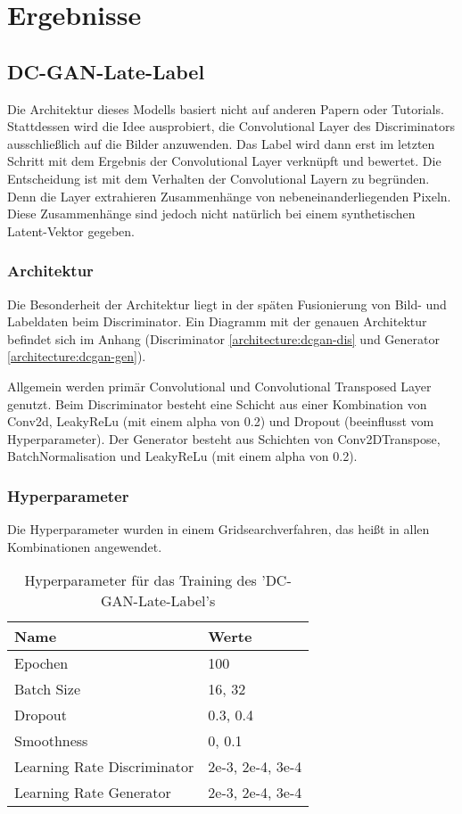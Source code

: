 
\chapter{Ergebnisse}

\section{DC-GAN-Late-Label}
Die Architektur dieses Modells basiert nicht auf anderen Papern oder Tutorials. 
Stattdessen wird die Idee ausprobiert, die Convolutional Layer des Discriminators ausschließlich auf die Bilder anzuwenden.
Das Label wird dann erst im letzten Schritt mit dem Ergebnis der Convolutional Layer verknüpft und bewertet.
Die Entscheidung ist mit dem Verhalten der Convolutional Layern zu begründen.
Denn die Layer extrahieren Zusammenhänge von nebeneinanderliegenden Pixeln.
Diese Zusammenhänge sind jedoch nicht natürlich bei einem synthetischen Latent-Vektor gegeben.

\subsection{Architektur}
Die Besonderheit der Architektur liegt in der späten Fusionierung von Bild- und Labeldaten beim Discriminator.
Ein Diagramm mit der genauen Architektur befindet sich im Anhang (Discriminator \cref{architecture:dcgan-dis} und Generator \cref{architecture:dcgan-gen}).


Allgemein werden primär Convolutional und Convolutional Transposed Layer genutzt.
Beim Discriminator besteht eine Schicht aus einer Kombination von Conv2d, LeakyReLu (mit einem alpha von 0.2) und Dropout (beeinflusst vom Hyperparameter).
Der Generator besteht aus Schichten von Conv2DTranspose, BatchNormalisation und LeakyReLu (mit einem alpha von 0.2).

\subsection{Hyperparameter}
Die Hyperparameter wurden in einem Gridsearchverfahren, das heißt in allen Kombinationen angewendet.
\begin{table}[H]
	\centering
	\begin{tabular}{l l}
		Name                        & Werte            \\ \hline
		Epochen                     & 100              \\
		Batch Size                  & 16, 32           \\
		Dropout                     & 0.3, 0.4         \\
		Smoothness                  & 0, 0.1           \\
		Learning Rate Discriminator & 2e-3, 2e-4, 3e-4 \\
		Learning Rate Generator     & 2e-3, 2e-4, 3e-4
	\end{tabular}
	\caption{Hyperparameter für das Training des 'DC-GAN-Late-Label's}
\end{table}

